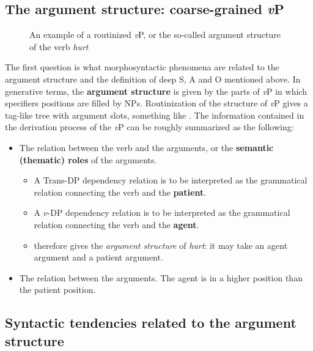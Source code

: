 \documentclass{article}
\newcommand*{\concept}[1]{\textbf{#1}}
\newcommand*{\term}[1]{\emph{#1}}
\newcommand*{\vP}{\textit{v}P}
\begin{document}
\subsection{The argument structure: coarse-grained \vP}

\begin{figure}
    \centering
    
    \caption{An example of a routinized \vP, or the so-called argument structure of the verb \term{hurt}}
    \label{fig:example-argument-structure}
\end{figure}

The first question is what morphosyntactic phenomena are related to 
the argument structure and
the definition of deep S, A and O mentioned above.
In generative terms, the \concept{argument structure} is given by the parts of \vP{}
in which specifiers positions are filled by NPs.
Routinization of the structure of \vP{} gives a \ac{tag}-like tree with argument slots,
something like .
The information contained in the derivation process of the \vP{} can be roughly summarized as the following:
\begin{itemize}
    \item The relation between the verb and the arguments, or 
    the \concept{semantic (thematic) roles} of the arguments. 
    \begin{itemize}
        \item A Trans-DP dependency relation is to be interpreted 
        as the grammatical relation connecting the verb and the \concept{patient}.
        \item A $v$-DP dependency relation is to be interpreted
        as the grammatical relation connecting the verb and the \concept{agent}.
        \item {} therefore gives the \emph{argument structure} of \term{hurt}:
        it may take an agent argument and a patient argument.
    \end{itemize}
    \item The relation between the arguments. The agent is in a higher position than the patient position.
\end{itemize}

\subsection{Syntactic tendencies related to the argument structure}
\end{document}
